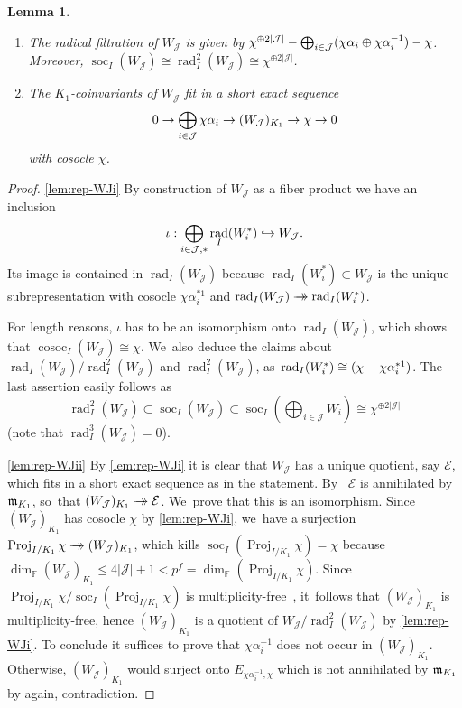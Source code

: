 \documentclass[JEP,XML,SOM,Unicode,NoFloatCountersInSection, NoEqCountersInSection,published]{cedram}
\newcommand\hto{\mathrel{\lhook\joinrel\to}}
\newcommand{\onto}{\mathchoice{\to\hspace*{-5mm}\to}{\mathrel{\hbox{$\to\hspace*{-2.85mm}\to$}}}{\to\hspace*{-3mm}\to}{\to\hspace*{-3mm}\to}}
\newcommand{\F}{\mathbb{F}}
\newcommand{\cJ}{{\mathcal{J}}}
\DeclareMathOperator{\cosoc}{cosoc}
\DeclareMathOperator{\Proj}{Proj}
\DeclareMathOperator{\rad}{rad}
\DeclareMathOperator{\soc}{soc}
\theoremstyle{plain}
\newtheorem{lem}[prop]{Lemma}
\theoremstyle{definition}
\begin{document}
\skpt
\begin{lem}\label{lem:rep-WJ}
\begin{enumerate}
\item\label{lem:rep-WJi} The radical filtration of $W_{\cJ}$ is given by $\chi^{\oplus 2|\cJ|} \-- \bigoplus_{i\in\cJ}(\chi\alpha_i\oplus\chi\alpha_i^{-1}) \-- \chi$. Moreover, $\soc_{I}(W_{\cJ})\cong \rad_{I}^2(W_{\cJ})\cong\chi^{\oplus 2|\cJ|}$.
\item\label{lem:rep-WJii} The $K_1$-coinvariants of $W_{\cJ}$ fit in a short exact sequence
\[
0\to \bigoplus_{i\in\cJ}\chi\alpha_i\to (W_{\cJ})_{K_1}\to \chi\ra0
\]
with cosocle $\chi$.
\end{enumerate}
\end{lem}

\skpt
\begin{proof}
\eqref{lem:rep-WJi} By construction of $W_\cJ$ as a fiber product we have an inclusion
\[
\iota:\bigoplus_{i\in\cJ,*} \rad_I(W_i^{*}) \hto W_\cJ.
\]
Its image is contained in $\rad_I(W_\cJ)$ because $\rad_I(W_i^{*}) \subset W_\cJ$ is the unique subrepresentation with cosocle $\chi \alpha_i^{*1}$ and $\rad_I(W_\cJ) \onto \rad_I(W_i^{*})$.

For length reasons, $\iota$ has to be an isomorphism onto $\rad_I(W_\cJ)$, which shows that $\cosoc_I(W_\cJ) \cong \chi$. We~also deduce the claims about $\rad_I(W_{\cJ})/\rad^2_I(W_{\cJ})$ and $\rad_I^2(W_{\cJ})$, as~$\rad_I(W_i^{*})\cong (\chi \-- \chi\alpha_i^{*1})$.
The last assertion easily follows as
\[
\rad^2_I(W_{\cJ})\subset \soc_I(W_{\cJ})\subset \soc_I(\bigoplus_{i\in\cJ}W_i)\cong \chi^{\oplus 2|\cJ|}
\]
(note that $\rad_I^3(W_{\cJ})=0$).

\eqref{lem:rep-WJii} {By \eqref{lem:rep-WJi}} it is clear that $W_{\cJ}$ has a unique quotient, say $\mathcal{E}$, which fits in a short exact sequence as in the statement. By~\cite[Lem.\,2.4(ii)]{yongquan-algebra} $\mathcal{E}$ is annihilated by $\mathfrak{m}_{K_1}$, so~that $(W_{\cJ})_{K_1}\onto \mathcal{E}$. We~prove that this is an isomorphism. Since $(W_{\cJ})_{K_1}$ has cosocle $\chi$ by \eqref{lem:rep-WJi}, we~have a surjection $\Proj_{I/K_1} \chi \onto (W_\cJ)_{K_1}$, which kills $\soc_I(\Proj_{I/K_1} \chi) = \chi$ because $\dim_\F(W_\cJ)_{K_1} \le 4|\cJ|+1 < p^f = \dim_\F(\Proj_{I/K_1} \chi)$.
Since $\Proj_{I/K_1} \chi/\soc_I(\Proj_{I/K_1} \chi)$ is multiplicity-free~\cite[Lem.\,6.1.3]{BHHMS1}, it~follows that $(W_\cJ)_{K_1}$ is multiplicity-free, hence $(W_\cJ)_{K_1}$ is a quotient of $W_{\cJ}/\rad^2_I(W_{\cJ})$ by \eqref{lem:rep-WJi}. To conclude it suffices to prove that $\chi\alpha_i^{-1}$ does not occur in $(W_{\cJ})_{K_1}$. Otherwise, $(W_{\cJ})_{K_1}$ would surject onto $E_{\chi\alpha_i^{-1},\chi}$ which is not annihilated by $\mathfrak{m}_{K_1}$ by \cite[Lem.\,2.4(ii)]{yongquan-algebra} again, contradiction.
\end{proof}
\end{document}
